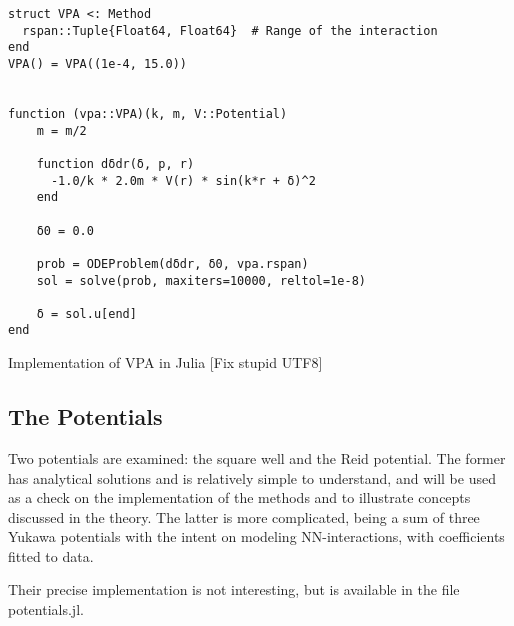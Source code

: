 \begin{listing}
  \begin{verbatim}
struct VPA <: Method
  rspan::Tuple{Float64, Float64}  # Range of the interaction
end
VPA() = VPA((1e-4, 15.0))


function (vpa::VPA)(k, m, V::Potential)
    m = m/2

    function dδdr(δ, p, r)
      -1.0/k * 2.0m * V(r) * sin(k*r + δ)^2
    end

    δ0 = 0.0

    prob = ODEProblem(dδdr, δ0, vpa.rspan)
    sol = solve(prob, maxiters=10000, reltol=1e-8)

    δ = sol.u[end]
end
  \end{verbatim}
  \caption{Implementation of VPA in Julia [Fix stupid UTF8]}
  \label{lst:vpa}
\end{listing}

\subsection{The Potentials}

Two potentials are examined: the square well and the Reid potential. The former
has analytical solutions and is relatively simple to understand, and will be
used as a check on the implementation of the methods and to illustrate concepts
discussed in the theory. The latter is more complicated, being a sum of three
Yukawa potentials with the intent on modeling NN-interactions, with coefficients
fitted to data. 

Their precise implementation is not interesting, but is available in the file
\textsf{potentials.jl}. 


